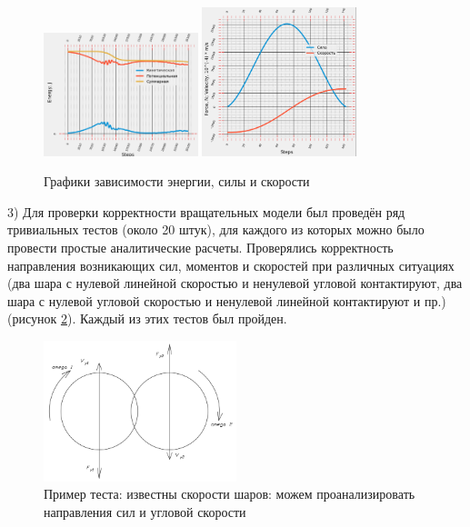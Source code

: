 \documentclass[utf8x, 14pt, oneside, a4paper]{article}
\begin{document}
\begin{figure}[H]
	\centering
	\includegraphics[width=0.4\textwidth , height=0.25\textheight]{graph1} 
	\includegraphics[width=0.4\textwidth , height=0.25\textheight]{graph2}
	\caption{Графики зависимости энергии, силы и скорости}
	\label{pic:graphs}
\end{figure} 

3) Для проверки корректности вращательных модели был проведён ряд тривиальных тестов (около 20 штук), для каждого из которых можно было провести простые аналитические расчеты. 
Проверялись корректность направления возникающих сил, моментов и скоростей при различных ситуациях (два шара с нулевой линейной скоростью и ненулевой угловой контактируют, два шара с нулевой угловой скоростью и ненулевой линейной контактируют и пр.) (рисунок \ref{pic:test_primer}).
Каждый из этих тестов был пройден.

\begin{figure}[H]
	\centering
	\includegraphics[width=0.5\textwidth]{test_primer} 
	\caption{Пример теста: известны скорости шаров: можем проанализировать направления сил и угловой скорости}
	\label{pic:test_primer}
\end{figure} 
\end{document}
